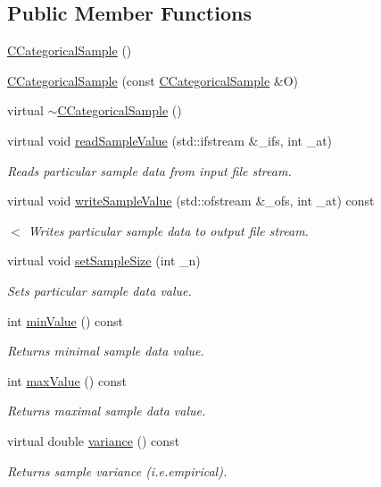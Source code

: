 \subsection*{Public Member Functions}
\begin{DoxyCompactItemize}
\item 
\hyperlink{class_c_categorical_sample_aab6ec20d09a316f730afc171537a7713}{C\-Categorical\-Sample} ()
\item 
\hyperlink{class_c_categorical_sample_ab66a69b33d8ca70fe3bb13c65d502054}{C\-Categorical\-Sample} (const \hyperlink{class_c_categorical_sample}{C\-Categorical\-Sample} \&O)
\item 
virtual \hyperlink{class_c_categorical_sample_a65c4e0faf826db2641f2d18e04a1fb4c}{$\sim$\-C\-Categorical\-Sample} ()
\item 
virtual void \hyperlink{class_c_categorical_sample_af1adebf697521884fdc51653ee5f4b97}{read\-Sample\-Value} (std\-::ifstream \&\-\_\-ifs, int \-\_\-at)
\begin{DoxyCompactList}\small\item\em Reads particular sample data from input file stream. \end{DoxyCompactList}\item 
virtual void \hyperlink{class_c_categorical_sample_ab20e228cf0a5b43de4981e1cc95da129}{write\-Sample\-Value} (std\-::ofstream \&\-\_\-ofs, int \-\_\-at) const 
\begin{DoxyCompactList}\small\item\em $<$ Writes particular sample data to output file stream. \end{DoxyCompactList}\item 
virtual void \hyperlink{class_c_categorical_sample_a7326fb12831014e2ee7504eb010f6356}{set\-Sample\-Size} (int \-\_\-n)
\begin{DoxyCompactList}\small\item\em Sets particular sample data value. \end{DoxyCompactList}\item 
int \hyperlink{class_c_categorical_sample_a4c14022735a64792701f670a6d6d38e6}{min\-Value} () const 
\begin{DoxyCompactList}\small\item\em Returns minimal sample data value. \end{DoxyCompactList}\item 
int \hyperlink{class_c_categorical_sample_a26021cff1304912e26023cddc399b67e}{max\-Value} () const 
\begin{DoxyCompactList}\small\item\em Returns maximal sample data value. \end{DoxyCompactList}\item 
virtual double \hyperlink{class_c_categorical_sample_a5408236fafb24d5a246823b97cc7427a}{variance} () const 
\begin{DoxyCompactList}\small\item\em Returns sample variance (i.\-e.\-empirical). \end{DoxyCompactList}\end{DoxyCompactItemize}
